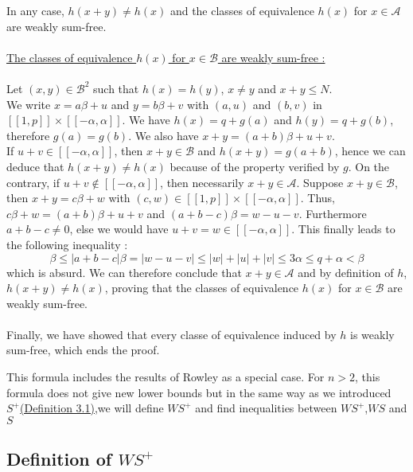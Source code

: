 In any case, \(h(x+y) \neq h(x)\) and the classes of equivalence \(h(x)\) for \(x \in \mathcal{A}\) are weakly
sum-free.\\
\\
\underline{The classes of equivalence \(h(x)\) for \(x \in \mathcal{B}\) are weakly sum-free :}
\\
\\
Let \((x,y) \in \mathcal{B}^2\) such that \(h(x) = h(y)\), \(x \neq y\) and \(x + y \leqslant N\).\\
We write \(x = a\beta + u\) and \(y = b\beta + v\) with \((a,u)\) and \((b,v)\) in \([\![1,p]\!] \times
[\![-\alpha,\alpha]\!]\).
We have \(h(x) = q + g(a)\) and \(h(y) = q + g(b)\), therefore \(g(a) = g(b)\). We also have \(x+y = (a+b)\beta + u
+v\).\\
If \(u + v \in [\![-\alpha,\alpha]\!]\), then \(x+y \in \mathcal{B}\) and \(h(x+y) = g(a+b)\), hence we can deduce that
\(h(x+y) \neq h(x)\) because of the property verified by \(g\). On the contrary, if \(u+v \notin
[\![-\alpha,\alpha]\!]\), then necessarily \(x+y \in \mathcal{A}\). Suppose \(x+y \in \mathcal{B}\), then \(x+y =
c\beta+ w\) with \((c,w) \in [\![1,p]\!] \times [\![-\alpha,\alpha]\!]\). Thus, \(c\beta + w = (a+b)\beta + u + v\) and
\((a+b-c)\beta = w-u-v\). Furthermore \(a+b-c \neq 0\), else we would have \(u+v = w \in [\![-\alpha,\alpha]\!]\). This
finally leads to the following inequality :
\[\beta \leqslant |a+b-c|\beta = |w-u-v| \leqslant |w| + |u| + |v| \leqslant 3\alpha \leqslant q + \alpha < \beta
\]
which is absurd. We can therefore conclude that \(x+y \in \mathcal{A}\) and by definition of \(h\), \(h(x+y) \neq
h(x)\), proving that the classes of equivalence \(h(x)\) for \(x \in \mathcal{B}\) are weakly sum-free.\\
\\
Finally, we have showed that every classe of equivalence induced by \(h\) is weakly sum-free, which ends the proof.

\begin{remark}
This formula includes the results of Rowley \cite{RowleyWS} as a special case. For \(n>2\),
this formula does not give new lower bounds but in the same way as we introduced \(S^+\)\hyperref[SE]{(Definition
3.1)},we will define \(WS^+\) and find inequalities between \(WS^+\),\(WS\) and \(S\)
\end{remark}

\subsection{Definition of \(WS^+\)}

